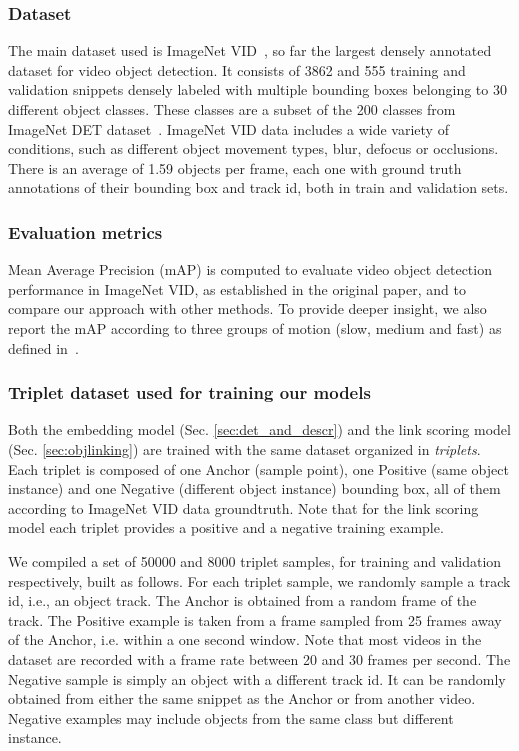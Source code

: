 \documentclass[letterpaper, 10 pt, conference]{ieeeconf}
\begin{document}
\subsubsection{Dataset}
\label{sec:datasets}
The main dataset used is ImageNet VID~\cite{ILSVRC15}, so far the largest densely annotated dataset for video object detection. It consists of 3862 and 555 training and validation snippets densely labeled with multiple bounding boxes belonging to 30 different object classes. These classes are a subset of the 200 classes from ImageNet DET dataset~\cite{ILSVRC15}. ImageNet VID data includes a wide variety of conditions, such as different object movement types, blur, defocus or occlusions. There is an average of 1.59 objects per frame, each one with ground truth annotations of their bounding box and track id, both in train and validation sets.

\subsubsection{Evaluation metrics}
Mean Average Precision (mAP) is computed to evaluate video object detection performance in ImageNet VID, as established in the original paper, and to compare our approach with other methods. To provide deeper insight, we also report the mAP according to three groups of motion (slow, medium and fast) as defined in~\cite{Zhu_2017_ICCV}. 


\subsubsection{Triplet dataset used for training our models}
\label{sec:triplet-dataset}

Both the embedding model (Sec. \ref{sec:det_and_descr}) and the link scoring model (Sec. \ref{sec:objlinking}) are trained with the same dataset organized in \textit{triplets}.
Each triplet is composed of one Anchor (sample point), one Positive (same object instance) and one Negative (different object instance) bounding box, 
all of them according to ImageNet VID data groundtruth. Note that for the link scoring model each triplet provides a positive and a negative training example. 


We compiled a set of 50000 and 8000 triplet samples, for training and validation respectively, built as follows. For each triplet sample, we randomly sample a track id, i.e., an object track. The Anchor is obtained from a random frame of the track.  The Positive example is taken from a frame sampled from  25 frames away of the Anchor, i.e. within a one second window. Note that most videos in the dataset are recorded with a frame rate between 20 and 30 frames per second. 
The Negative sample is simply an object with a different track id. It can be randomly obtained from either the same snippet as the Anchor or from another video. Negative examples may include objects from the same class but different instance. 
\end{document}
